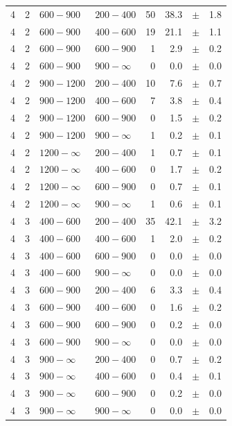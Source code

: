\begin{table}[!h]
\begin{tabular}{rrllrrcl}
4 & 2 & $ 600- 900$ & $200-400$ &     50 &     38.3 &$\pm$&    1.8 \\
4 & 2 & $ 600- 900$ & $400-600$ &     19 &     21.1 &$\pm$&    1.1 \\
4 & 2 & $ 600- 900$ & $600-900$ &      1 &      2.9 &$\pm$&    0.2 \\
4 & 2 & $ 600- 900$ & $900-\infty$ &      0 &      0.0 &$\pm$&    0.0 \\
4 & 2 & $ 900-1200$ & $200-400$ &     10 &      7.6 &$\pm$&    0.7 \\
4 & 2 & $ 900-1200$ & $400-600$ &      7 &      3.8 &$\pm$&    0.4 \\
4 & 2 & $ 900-1200$ & $600-900$ &      0 &      1.5 &$\pm$&    0.2 \\
4 & 2 & $ 900-1200$ & $900-\infty$ &      1 &      0.2 &$\pm$&    0.1 \\
4 & 2 & $1200- \infty$ & $200-400$ &      1 &      0.7 &$\pm$&    0.1 \\
4 & 2 & $1200- \infty$ & $400-600$ &      0 &      1.7 &$\pm$&    0.2 \\
4 & 2 & $1200- \infty$ & $600-900$ &      0 &      0.7 &$\pm$&    0.1 \\
4 & 2 & $1200- \infty$ & $900-\infty$ &      1 &      0.6 &$\pm$&    0.1 \\
4 & 3 & $ 400- 600$ & $200-400$ &     35 &     42.1 &$\pm$&    3.2 \\
4 & 3 & $ 400- 600$ & $400-600$ &      1 &      2.0 &$\pm$&    0.2 \\
4 & 3 & $ 400- 600$ & $600-900$ &      0 &      0.0 &$\pm$&    0.0 \\
4 & 3 & $ 400- 600$ & $900-\infty$ &      0 &      0.0 &$\pm$&    0.0 \\
4 & 3 & $ 600- 900$ & $200-400$ &      6 &      3.3 &$\pm$&    0.4 \\
4 & 3 & $ 600- 900$ & $400-600$ &      0 &      1.6 &$\pm$&    0.2 \\
4 & 3 & $ 600- 900$ & $600-900$ &      0 &      0.2 &$\pm$&    0.0 \\
4 & 3 & $ 600- 900$ & $900-\infty$ &      0 &      0.0 &$\pm$&    0.0 \\
4 & 3 & $ 900- \infty$ & $200-400$ &      0 &      0.7 &$\pm$&    0.2 \\
4 & 3 & $ 900- \infty$ & $400-600$ &      0 &      0.4 &$\pm$&    0.1 \\
4 & 3 & $ 900- \infty$ & $600-900$ &      0 &      0.2 &$\pm$&    0.0 \\
4 & 3 & $ 900- \infty$ & $900-\infty$ &      0 &      0.0 &$\pm$&    0.0 \\
    \hline
  \end{tabular}
\end{table}

